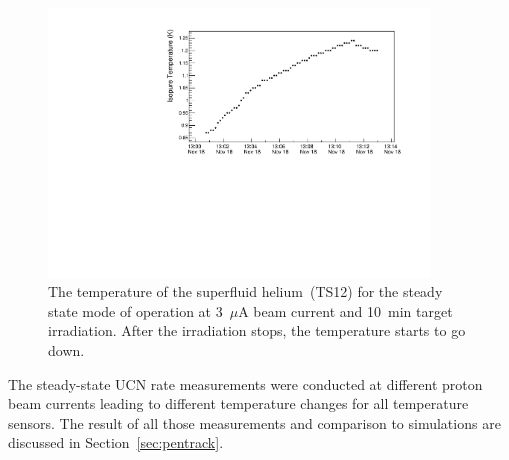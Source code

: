 \begin{figure}[h!]
  \centering
  \includegraphics[width=0.9\textwidth]{UCNRate_temp.pdf}
  \caption{ The temperature of the superfluid helium~(TS12) for the
    steady state mode of operation at 3~$\mu$A beam current and 10~min
    target irradiation. After the irradiation stops, the temperature
    starts to go down. }
  \label{fig:UCNRate_temp}
\end{figure}


The steady-state UCN rate measurements were conducted at different
proton beam currents leading to different temperature changes for all
temperature sensors. The result of all those measurements and
comparison to simulations are discussed in Section~\ref{sec:pentrack}.








